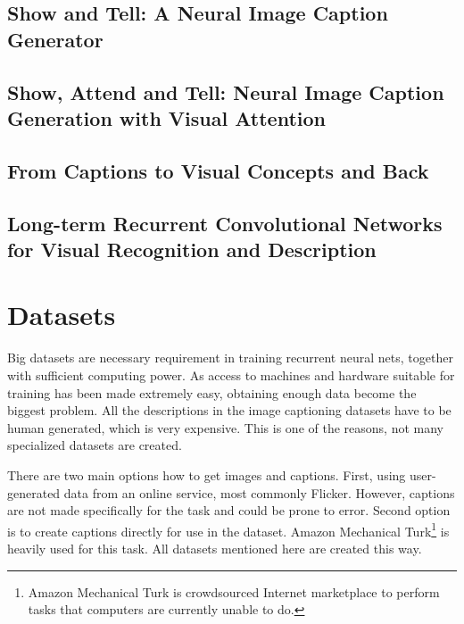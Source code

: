 
		\subsection{Show and Tell: A Neural Image Caption Generator}
		\cite{DBLP:journals/corr/VinyalsTBE14}
		
		
		\subsection{Show, Attend and Tell: Neural Image Caption Generation with Visual Attention}
		\cite{DBLP:journals/corr/XuBKCCSZB15}
		
		\subsection{From Captions to Visual Concepts and Back}
		\cite{DBLP:journals/corr/FangGISDDGHMPZZ14}
		
		\subsection{Long-term Recurrent Convolutional Networks for Visual Recognition and Description}
		\cite{DBLP:journals/corr/DonahueHGRVSD14}


	\section{Datasets}
	\label{sec:datasets}		
Big datasets are necessary requirement in training recurrent neural nets, together with sufficient computing power. As access to machines and hardware suitable for training has been made extremely easy, obtaining enough data become the biggest problem. All the descriptions in the image captioning datasets have to be human generated, which is very expensive. This is one of the reasons, not many specialized datasets are created.

There are two main options how to get images and captions. First, using user-generated data from an online service, most commonly Flicker. However, captions are not made specifically for the task and could be prone to error. Second option is to create captions directly for use in the dataset. Amazon Mechanical Turk\footnote{Amazon Mechanical Turk is crowdsourced Internet marketplace to perform tasks that computers are currently unable to do.} is heavily used for this task. All datasets mentioned here are created this way.

